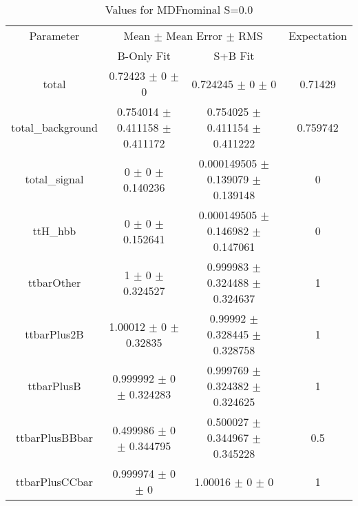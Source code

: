\begin{table}
\centering
\caption{Values for MDFnominal S=0.0}
\begin{tabular}{cccc}
\toprule
Parameter & \multicolumn{2}{c}{Mean $\pm$ Mean Error $\pm$ RMS} & Expectation\\
 & B-Only Fit & S+B Fit & \\
\midrule
total & \num{0.72423} $\pm$ \num{0} $\pm$ \num{0} & \num{0.724245} $\pm$ \num{0} $\pm$ \num{0} & \num{0.71429}\\
total\_background & \num{0.754014} $\pm$ \num{0.411158} $\pm$ \num{0.411172} & \num{0.754025} $\pm$ \num{0.411154} $\pm$ \num{0.411222} & \num{0.759742}\\
total\_signal & \num{0} $\pm$ \num{0} $\pm$ \num{0.140236} & \num{0.000149505} $\pm$ \num{0.139079} $\pm$ \num{0.139148} & \num{0}\\
ttH\_hbb & \num{0} $\pm$ \num{0} $\pm$ \num{0.152641} & \num{0.000149505} $\pm$ \num{0.146982} $\pm$ \num{0.147061} & \num{0}\\
ttbarOther & \num{1} $\pm$ \num{0} $\pm$ \num{0.324527} & \num{0.999983} $\pm$ \num{0.324488} $\pm$ \num{0.324637} & \num{1}\\
ttbarPlus2B & \num{1.00012} $\pm$ \num{0} $\pm$ \num{0.32835} & \num{0.99992} $\pm$ \num{0.328445} $\pm$ \num{0.328758} & \num{1}\\
ttbarPlusB & \num{0.999992} $\pm$ \num{0} $\pm$ \num{0.324283} & \num{0.999769} $\pm$ \num{0.324382} $\pm$ \num{0.324625} & \num{1}\\
ttbarPlusBBbar & \num{0.499986} $\pm$ \num{0} $\pm$ \num{0.344795} & \num{0.500027} $\pm$ \num{0.344967} $\pm$ \num{0.345228} & \num{0.5}\\
ttbarPlusCCbar & \num{0.999974} $\pm$ \num{0} $\pm$ \num{0} & \num{1.00016} $\pm$ \num{0} $\pm$ \num{0} & \num{1}\\
\bottomrule
\end{tabular}
\end{table}